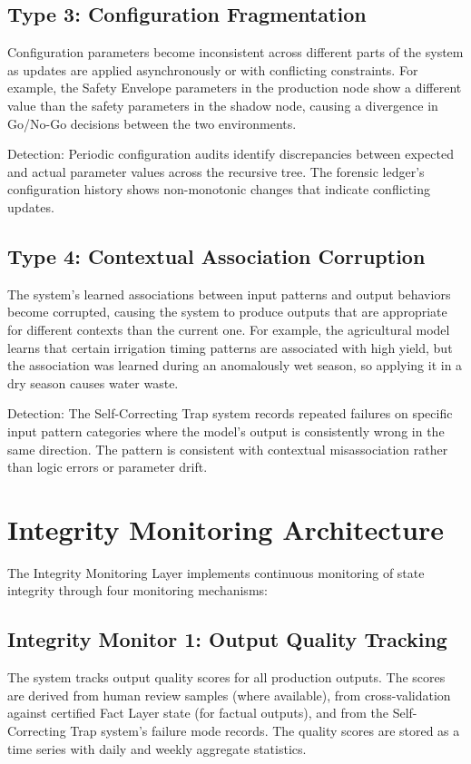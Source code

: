 \documentclass[12pt]{article}
\begin{document}
\subsection{Type 3: Configuration Fragmentation}
Configuration parameters become inconsistent across different parts of the system as updates are applied asynchronously or with conflicting constraints. For example, the Safety Envelope parameters in the production node show a different value than the safety parameters in the shadow node, causing a divergence in Go/No-Go decisions between the two environments.

Detection: Periodic configuration audits identify discrepancies between expected and actual parameter values across the recursive tree. The forensic ledger's configuration history shows non-monotonic changes that indicate conflicting updates.

\subsection{Type 4: Contextual Association Corruption}
The system's learned associations between input patterns and output behaviors become corrupted, causing the system to produce outputs that are appropriate for different contexts than the current one. For example, the agricultural model learns that certain irrigation timing patterns are associated with high yield, but the association was learned during an anomalously wet season, so applying it in a dry season causes water waste.

Detection: The Self-Correcting Trap system records repeated failures on specific input pattern categories where the model's output is consistently wrong in the same direction. The pattern is consistent with contextual misassociation rather than logic errors or parameter drift.

\section{Integrity Monitoring Architecture}
The Integrity Monitoring Layer implements continuous monitoring of state integrity through four monitoring mechanisms:

\subsection{Integrity Monitor 1: Output Quality Tracking}
The system tracks output quality scores for all production outputs. The scores are derived from human review samples (where available), from cross-validation against certified Fact Layer state (for factual outputs), and from the Self-Correcting Trap system's failure mode records. The quality scores are stored as a time series with daily and weekly aggregate statistics.
\end{document}
